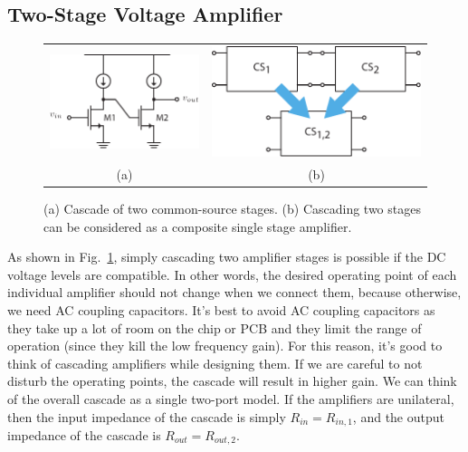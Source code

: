 \section{\topicB}
\subsection{Two-Stage Voltage Amplifier}
\begin{figure}[tb]
\centering
\begin{tabular}{cc}
\includegraphics[scale=1]{cs_cascade_sch} &
\includegraphics[width=.5\columnwidth]{1cascade}\\
(a) & (b)\\
\end{tabular}
\caption{(a) Cascade of two common-source stages.  (b) Cascading two stages can be considered as a composite single stage amplifier.}
\label{fig:1cascade}
\end{figure}
As shown in Fig.~\ref{fig:1cascade}, simply cascading two amplifier stages is possible if the DC voltage levels are compatible. In other words, the desired operating point of each individual amplifier should not change when we connect them, because otherwise, we need AC coupling capacitors.  It's best to avoid AC coupling capacitors as they take up a lot of room on the chip or PCB and they limit the range of operation (since they kill the low frequency gain).  For this reason, it's good to think of cascading amplifiers while designing them.  If we are careful to not disturb the operating points, the cascade will result in higher gain.  We can think of the overall cascade as a single two-port model.  If the amplifiers are unilateral, then the input impedance of the cascade is simply  $R_{in} = R_{in,1}$, and the output impedance of the cascade is $R_{out} = R_{out,2}$.
